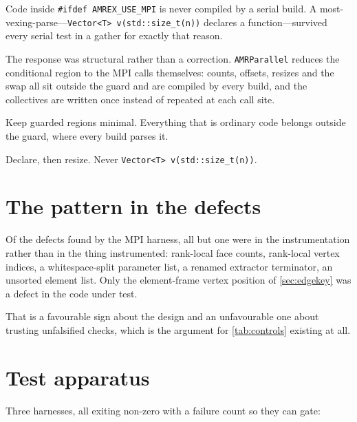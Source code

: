 Code inside \texttt{\#ifdef AMREX\_USE\_MPI} is never compiled by a serial
build. A most-vexing-parse---\texttt{Vector<T> v(std::size\_t(n))} declares a
function---survived every serial test in a gather for exactly that reason.

The response was structural rather than a correction. \texttt{AMRParallel}
reduces the conditional region to the MPI calls themselves: counts, offsets,
resizes and the swap all sit outside the guard and are compiled by every build,
and the collectives are written once instead of repeated at each call site.

\begin{designrule}\label{rule:guard}
Keep guarded regions minimal. Everything that is ordinary code belongs outside
the guard, where every build parses it.
\end{designrule}

\begin{designrule}\label{rule:vexing}
Declare, then resize. Never \texttt{Vector<T> v(std::size\_t(n))}.
\end{designrule}

\section{The pattern in the defects}

Of the defects found by the MPI harness, all but one were in the instrumentation
rather than in the thing instrumented: rank-local face counts, rank-local vertex
indices, a whitespace-split parameter list, a renamed extractor terminator, an
unsorted element list. Only the element-frame vertex position of
\cref{sec:edgekey} was a defect in the code under test.

That is a favourable sign about the design and an unfavourable one about
trusting unfalsified checks, which is the argument for \cref{tab:controls}
existing at all.

\section{Test apparatus}

Three harnesses, all exiting non-zero with a failure count so they can gate:

